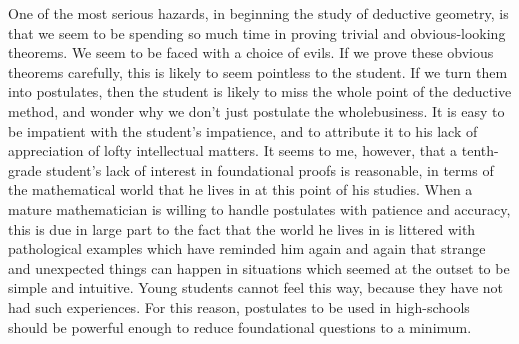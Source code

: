 One of the most serious hazards, in beginning the study of deductive
geometry, is that we seem to be spending  so much time in proving
trivial and obvious-looking theorems. We seem to be faced with a
choice of evils. If we prove these obvious theorems carefully, this is
likely to seem pointless to the student. If we turn them into
postulates, then the student is likely to miss the whole point of the
deductive method, and wonder why we don't just postulate the
whole\pageoriginale business. It is easy to be impatient with the
student's impatience, and to attribute it to his lack of appreciation
of lofty intellectual matters. It seems to me, however, that a
tenth-grade student's lack of interest in foundational proofs is
reasonable, in terms of the mathematical world that he lives in at
this point of his studies. When a mature mathematician is willing to
handle postulates with patience and accuracy, this is due in large
part to the fact that the world he lives in is littered with
pathological examples which have reminded him again and again that
strange and unexpected things can happen in situations which seemed at
the outset to be simple and intuitive. Young students cannot feel this
way, because they have not had such experiences. For this reason,
postulates to be used in high-schools should be powerful enough to
reduce foundational questions to a minimum. 

